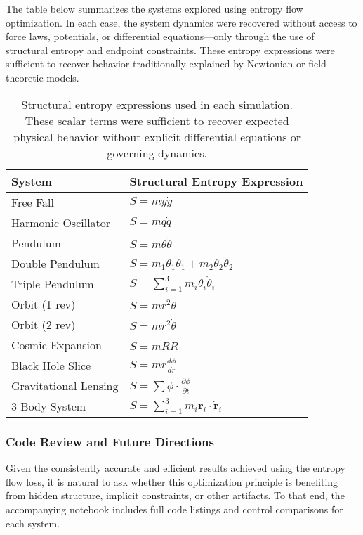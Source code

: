 \documentclass[12pt]{article}
\begin{document}
The table below summarizes the systems explored using entropy flow optimization. In each case, the system dynamics were recovered without access to force laws, potentials, or differential equations—only through the use of structural entropy and endpoint constraints. These entropy expressions were sufficient to recover behavior traditionally explained by Newtonian or field-theoretic models.

\begin{table}[H]
\centering
\begin{tabular}{|l|l|}
\hline
\textbf{System} & \textbf{Structural Entropy Expression} \\
\hline
Free Fall & \( S = m y \dot{y} \) \\
Harmonic Oscillator & \( S = m q \dot{q} \) \\
Pendulum & \( S = m \theta \dot{\theta} \) \\
Double Pendulum & \( S = m_1 \theta_1 \dot{\theta}_1 + m_2 \theta_2 \dot{\theta}_2 \) \\
Triple Pendulum & \( S = \sum_{i=1}^{3} m_i \theta_i \dot{\theta}_i \) \\
Orbit (1 rev) & \( S = m r^2 \dot{\theta} \) \\
Orbit (2 rev) & \( S = m r^2 \dot{\theta} \) \\
Cosmic Expansion & \( S = m R \dot{R} \) \\
Black Hole Slice & \( S = m r \frac{d\phi}{dr} \) \\
Gravitational Lensing & \( S = \sum \phi \cdot \frac{\partial \phi}{\partial t} \) \\
3-Body System & \( S = \sum_{i=1}^{3} m_i \mathbf{r}_i \cdot \dot{\mathbf{r}}_i \) \\
\hline
\end{tabular}
\caption{Structural entropy expressions used in each simulation. These scalar terms were sufficient to recover expected physical behavior without explicit differential equations or governing dynamics.}
\end{table}


\subsubsection{Code Review and Future Directions}

Given the consistently accurate and efficient results achieved using the entropy flow loss, it is natural to ask whether this optimization principle is benefiting from hidden structure, implicit constraints, or other artifacts. To that end, the accompanying notebook includes full code listings and control comparisons for each system.
\end{document}

